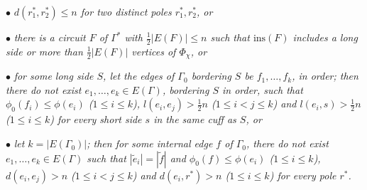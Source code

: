 \hspace*{12pt}$\bullet$ \textit{$d(r^*_1, r^*_2) \le n$ for two distinct poles $r^*_1, r^*_2$, or}

\hspace*{12pt}$\bullet$ \textit{there is a circuit $F$ of $\Gamma^*$ with $\frac{1}{2}|E(F)| \le n$ such that $\text{ins}(F)$ includes a long side or more than $\frac{1}{2}|E(F)|$ vertices of $\Phi_\chi$, or}

\hspace*{12pt}$\bullet$ \textit{for some long side $S$, let the edges of $\Gamma_0$ bordering $S$ be $f_1, \dots, f_k$, in order; then there do not exist $e_1, \dots, e_k \in E(\Gamma)$, bordering $S$ in order, such that $\phi_0(f_i) \le \phi(e_i)$ ($1 \le i \le k$), $l(e_i, e_j) > \frac{1}{2}n$ ($1 \le i < j \le k$) and $l(e_i, s) > \frac{1}{2}n$ ($1 \le i \le k$) for every short side $s$ in the same cuff as $S$, or}

\hspace*{12pt}$\bullet$ \textit{let $k = |E(\Gamma_0)|$; then for some internal edge $f$ of $\Gamma_0$, there do not exist $e_1, \dots, e_k \in E(\Gamma)$ such that $|\tilde{e}_i| = |\tilde{f}|$ and $\phi_0(f) \le \phi(e_i)$ ($1 \le i \le k$), $d(e_i, e_j) > n$ ($1 \le i < j \le k$) and $d(e_i, r^*) > n$ ($1 \le i \le k$) for every pole $r^*$.}
